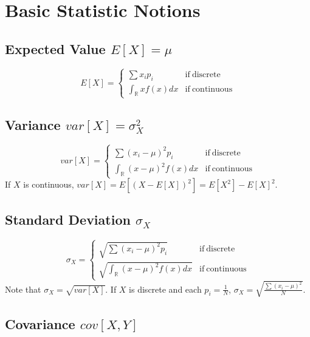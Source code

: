 \documentclass{article}
\begin{document}
    \section{Basic Statistic Notions}
        \subsection{Expected Value \texorpdfstring{$E[X]=\mu$}{}}
            \[
                E[X]=\left\{\begin{array}{ll}
                        \sum x_ip_i& \mathrm{if~discrete} \\[0.2cm]
                        \int_{\mathbb{R}}xf(x)dx & \mathrm{if~continuous}
                \end{array}\right.
            \]
        \subsection{Variance \texorpdfstring{$var[X]=\sigma_X^2$}{}}
            \[
                var[X]=\left\{\begin{array}{ll}
                        \sum (x_i-\mu)^2p_i& \mathrm{if~discrete} \\[0.2cm]
                        \int_{\mathbb{R}}(x-\mu)^2f(x)dx & \mathrm{if~continuous}
                \end{array}\right.
            \]
            If $X$ is continuous, $var[X]=E[(X-E[X])^2]=E[X^2] - E[X]^2$.
        \subsection{Standard Deviation \texorpdfstring{$\sigma_X$}{}}
            \[
                \sigma_X=\left\{\begin{array}{ll}
                        \sqrt{\sum(x_i-\mu)^2p_i}& \mathrm{if~discrete} \\[0.2cm]
                        \sqrt{\int_{\mathbb{R}}(x-\mu)^2f(x)dx} & \mathrm{if~continuous}
                \end{array}\right.
            \]
            Note that $\sigma_X=\sqrt{var[X]}$. If $X$ is discrete and each $p_i=\frac{1}{N}$, $\sigma_X=\sqrt{\frac{\sum(x_i-\mu)^2}{N}}$.
        \subsection{Covariance \texorpdfstring{$cov[X,Y]$}{}}
\end{document}
